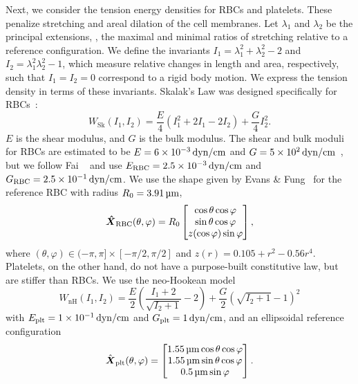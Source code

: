 Next, we consider the tension energy densities for RBCs and platelets. These penalize stretching and areal
dilation of the cell membranes. Let $\lambda_1$ and $\lambda_2$ be the principal extensions, , the
maximal and minimal ratios of stretching relative to a reference configuration. We define the invariants
$I_1=\lambda_1^2+\lambda_2^2-2$ and $I_2 = \lambda_1^2\lambda_2^2-1$, which measure relative changes in length and
area, respectively, such that $I_1 = I_2 = 0$ correspond to a rigid body motion. We express the tension density in
terms of these invariants. Skalak's Law was designed specifically for RBCs~\cite{Skalak:1973tp}:
\begin{equation}\label{eq:skalak-law}
    W_\text{Sk}(I_1, I_2) = \frac{E}4\left(I_1^2 + 2I_1 - 2I_2\right) + \frac{G}4 I_2^2.
\end{equation}
$E$ is the shear modulus, and $G$ is the bulk modulus. The shear and bulk moduli for RBCs are estimated to be
$E = 6\sci{-3}\dynpercm$ and $G = 5\sci2\dynpercm$~\cite{Mohandas:1994tg}, but we follow Fai ~%
\cite{Fai:2013do} and use $\rbc{E} = 2.5\sci{-3}\dynpercm$ and $\rbc{G} = 2.5\sci{-1}\dynpercm$. We use
the shape given by Evans \& Fung~\cite{Evans:1972uf} for the reference RBC with radius $R_0 = 3.91\um$,
\begin{equation}
    {\boldsymbol{\hat{X}}}_\text{RBC}(\theta, \varphi) = R_0\begin{bmatrix}
            \cos\theta\cos\varphi \\
            \sin\theta\cos\varphi \\
            z(\cos\varphi)\sin\varphi
    \end{bmatrix},
\end{equation}
where $(\theta, \varphi)\in(-\pi, \pi]\times[-\pi/2, \pi/2]$ and $z(r) = 0.105 + r^2 - 0.56r^4$. Platelets, on the
other hand, do not have a purpose-built constitutive law, but are stiffer than RBCs. We use the neo-Hookean model
\begin{equation}\label{eq:neohookean}
    W_\text{nH}(I_1, I_2) = \frac{E}2\left(\frac{I_1+2}{\sqrt{I_2+1}}-2\right) + \frac{G}2 {\left(\sqrt{I_2+1}-1\right)}^2
\end{equation}
with $\plt{E} = 1\sci{-1}\dynpercm$ and $\plt{G} = 1\dynpercm$, and an ellipsoidal reference configuration~%
\cite{Frojmovic:1982wk}
\begin{equation}
    \plt{\hat{\vec{X}}}(\theta, \varphi) = \begin{bmatrix}
            1.55\um\cos\theta\cos\varphi \\
            1.55\um\sin\theta\cos\varphi \\
            0.5\um\sin\varphi
    \end{bmatrix}.
\end{equation}

